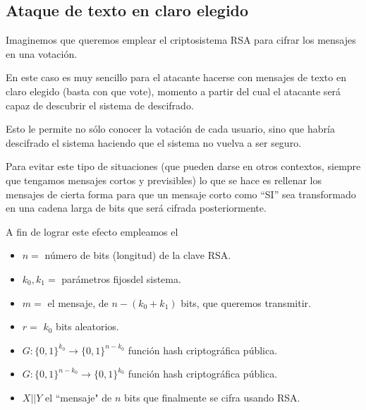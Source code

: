\subsection{Ataque de texto en claro elegido}
Imaginemos que queremos emplear el criptosistema RSA para cifrar los mensajes en una votación.

En este caso es muy sencillo para el atacante hacerse con mensajes de texto en claro elegido (basta con que vote), momento a partir del cual el atacante será capaz de descubrir el sistema de descifrado. 

Esto le permite no sólo conocer la votación de cada usuario, sino que habría descifrado el sistema haciendo que el sistema no vuelva a ser seguro.

Para evitar este tipo de situaciones (que pueden darse en otros contextos, siempre que tengamos mensajes cortos y previsibles) lo que se hace es rellenar los mensajes de cierta forma para que un mensaje corto como ``SI'' sea transformado en una cadena larga de bits que será cifrada posteriormente.


A fin de lograr este efecto empleamos el 

\begin{itemize}
\item $n=$ número de bits (longitud) de la clave RSA.
\item $k_0, k_1=$ parámetros fijosdel sistema.
\item $m=$ el mensaje, de $n-(k_0+k_1)$ bits, que queremos transmitir.
\item $r=$ $k_0$ bits aleatorios.
\item $G:\{0,1\}^{k_0}\longrightarrow \{0,1\}^{n-k_0}$ función hash criptográfica pública.
\item $G:\{0,1\}^{n-k_0}\longrightarrow \{0,1\}^{k_0}$ función hash criptográfica pública.
\item $X||Y$ el ``mensaje" de $n$ bits que finalmente se cifra usando RSA.
\end{itemize}

